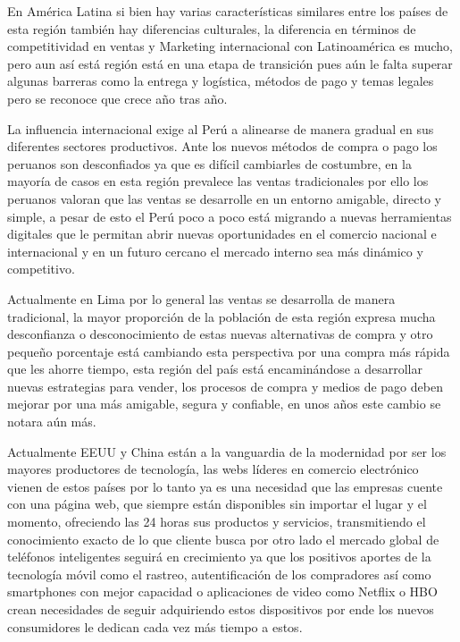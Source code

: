 
En América Latina si bien hay varias características similares entre los países de esta región también hay diferencias culturales, la diferencia en términos de competitividad en ventas y Marketing internacional con Latinoamérica es mucho, pero aun así está región está en una etapa de transición pues aún le falta superar algunas barreras como la  entrega y logística, métodos de pago y temas legales pero se reconoce que crece año tras año.


La influencia internacional exige al Perú a alinearse de manera gradual en sus diferentes sectores productivos. Ante los nuevos métodos de compra o pago los peruanos son desconfiados ya que es difícil cambiarles de costumbre, en la mayoría de casos en esta región prevalece las ventas tradicionales por ello los peruanos valoran que las ventas se desarrolle en un entorno amigable, directo y simple, a pesar de esto el Perú poco a poco está migrando a nuevas herramientas digitales que le permitan abrir nuevas oportunidades en el comercio nacional e internacional y en un futuro cercano el  mercado interno sea más dinámico y competitivo.

Actualmente en Lima por lo general las ventas se desarrolla de manera tradicional, la mayor proporción de la población de esta región expresa mucha desconfianza o desconocimiento de estas nuevas alternativas de compra y otro pequeño porcentaje está cambiando esta perspectiva  por una compra más rápida que les ahorre tiempo, esta región del país está encaminándose a desarrollar nuevas estrategias para vender, los procesos de compra y medios de pago deben mejorar por una más amigable, segura y confiable, en unos años este cambio se notara aún más.

Actualmente EEUU y China están a la vanguardia de la modernidad por ser los mayores productores de tecnología, las webs líderes en comercio electrónico vienen de estos países por lo tanto ya es una necesidad que las empresas cuente con una página web, que siempre están disponibles sin importar el lugar y el momento, ofreciendo las 24 horas sus productos y servicios, transmitiendo el conocimiento exacto de lo que cliente busca por otro lado el mercado global de teléfonos inteligentes seguirá en crecimiento ya que los positivos aportes de la tecnología móvil como el rastreo, autentificación de los compradores así como smartphones con mejor capacidad o aplicaciones de video como Netflix o HBO crean necesidades de seguir adquiriendo estos dispositivos por ende los nuevos consumidores le dedican cada vez más tiempo a estos.


